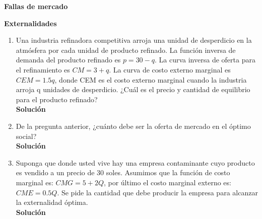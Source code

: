 \documentclass[10pt,a4paper]{article}
\begin{document}
	\begin{center}
		{\Large {\textbf{Fallas de mercado}}}		
	\end{center}
\textbf{\LARGE Externalidades}
	\begin{enumerate}
		\item Una industria refinadora competitiva arroja una unidad de desperdicio en la atmósfera por cada unidad de producto refinado. La función inversa de demanda del producto refinado es $p=30-q$. La curva inversa de oferta para el refinamiento es $CM=3+q$. La curva de costo externo marginal es $CEM=1.5q$,  donde CEM es el costo externo marginal cuando la industria arroja q unidades de desperdicio. ¿Cuál es el precio y cantidad de equilibrio para el producto refinado?\\
		
			\textbf{\large Solución}\\
				
		
		\item De la pregunta anterior, ¿cuánto debe ser la oferta de mercado en el óptimo social?\\
		
			\textbf{\large Solución}\\
				
		
		\item Suponga que donde usted vive hay una empresa contaminante cuyo producto es vendido a un precio de 30 soles. Asumimos que la función de costo marginal es: $CMG = 5 + 2Q$, por último el costo marginal externo es: $CME = 0.5Q$. Se pide la cantidad que debe producir la empresa para alcanzar la externalidad óptima.\\
		
			\textbf{\large Solución}\\
				
	\end{enumerate}
\end{document}
